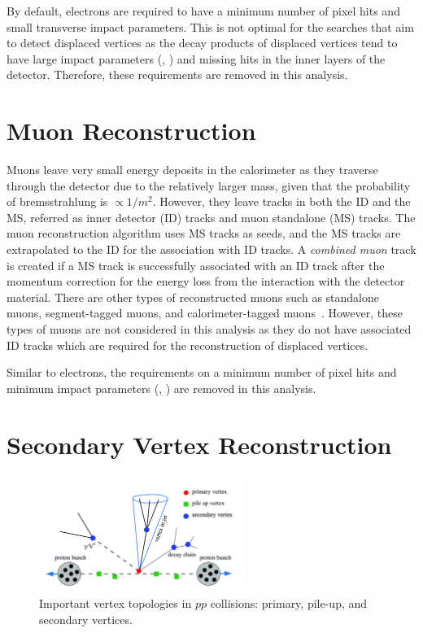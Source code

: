 By default, electrons are required to have a minimum number of pixel hits and small transverse impact parameters. This is not optimal for the searches that aim to detect displaced vertices as the decay products of displaced vertices tend to have large impact parameters (\dzero, \zzero) and missing hits in the inner layers of the detector. Therefore, these requirements are removed in this analysis.

\section{Muon Reconstruction}
\label{sec:reco:muon}

Muons leave very small energy deposits in the calorimeter as they traverse through the detector due to the relatively larger mass, given that the probability of bremsstrahlung is $\propto 1/m^{2}$. However, they leave tracks in both the ID and the MS, referred as inner detector (ID) tracks and muon standalone (MS) tracks. The muon reconstruction algorithm uses MS tracks as seeds, and the MS tracks are extrapolated to the ID for the association with ID tracks. A \textit{combined muon} track is created if a MS track is successfully associated with an ID track after the momentum correction for the energy loss from the interaction with the detector material. There are other types of reconstructed muons such as standalone muons, segment-tagged muons, and calorimeter-tagged muons~\cite{Aad:2016jkr}. However, these types of muons are not considered in this analysis as they do not have associated ID tracks which are required for the reconstruction of displaced vertices.

Similar to electrons, the requirements on a minimum number of pixel hits and minimum impact parameters (\dzero, \zzero) are removed in this analysis.


\section{Secondary Vertex Reconstruction}
\label{sec:reco:dv}

\begin{figure}[!htb]
    \includegraphics[width=0.6\textwidth]{figs/vertex.png}
    \centering
    \caption{Important vertex topologies in $pp$ collisions: primary, pile-up, and secondary vertices.}
    \label{fig:vertex_topology}
\end{figure}

